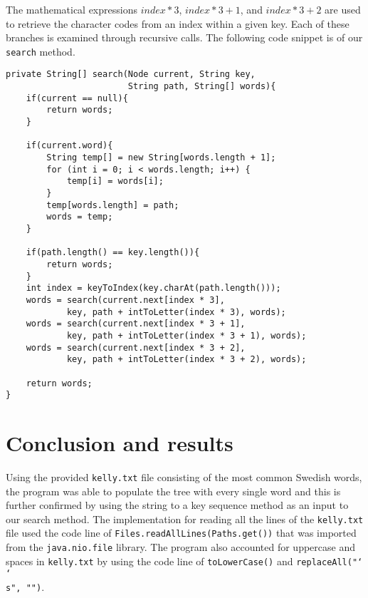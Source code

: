 \documentclass[a4paper,11pt]{article}
\begin{document}
            The mathematical expressions $index * 3$, $index * 3 + 1$, and $index * 3 + 2$ are used to retrieve the character codes from an index within a given key. Each of these branches is examined through recursive calls. The following code snippet is of our \texttt{search} method.
\begin{verbatim}
private String[] search(Node current, String key, 
                        String path, String[] words){
    if(current == null){
        return words;
    }
    
    if(current.word){
        String temp[] = new String[words.length + 1];
        for (int i = 0; i < words.length; i++) {
            temp[i] = words[i];
        }
        temp[words.length] = path;
        words = temp;
    }
    
    if(path.length() == key.length()){
        return words;
    }
    int index = keyToIndex(key.charAt(path.length()));
    words = search(current.next[index * 3], 
            key, path + intToLetter(index * 3), words);
    words = search(current.next[index * 3 + 1], 
            key, path + intToLetter(index * 3 + 1), words);
    words = search(current.next[index * 3 + 2], 
            key, path + intToLetter(index * 3 + 2), words);
    
    return words;
}
\end{verbatim}

\section*{Conclusion and results}

    Using the provided \texttt{kelly.txt} file consisting of the most common Swedish words, the program was able to populate the tree with every single word and this is further confirmed by using the string to a key sequence method as an input to our search method. The implementation for reading all the lines of the \texttt{kelly.txt} file used the code line of \texttt{Files.readAllLines(Paths.get())} that was imported from the \texttt{java.nio.file} library. The program also accounted for uppercase and spaces in \texttt{kelly.txt} by using the code line of \texttt{toLowerCase()} and \texttt{replaceAll("\char`\\\char`\\s", "")}. 
    
\end{document}
